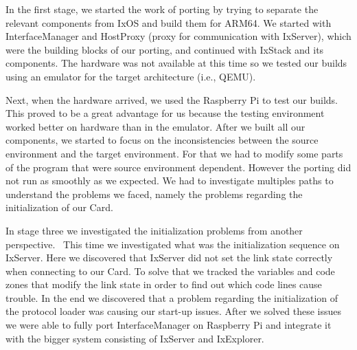 
In the first stage, we started the work of porting by trying to separate the
relevant components from IxOS and build them for ARM64. We started with
InterfaceManager and HostProxy (proxy for communication with IxServer), which
were the building blocks of our porting, and continued with IxStack and its
components. The hardware was not available at this time so we tested our builds
using an emulator for the target architecture (i.e., QEMU).

Next, when the hardware arrived, we used the Raspberry Pi to test our builds.
This proved to be a great advantage for us because the testing environment
worked better on hardware than in the emulator. After we built all our
components, we started to focus on the inconsistencies between the source
environment and the target environment. For that we had to modify some parts of
the program that were source environment dependent. However the porting did not
run as smoothly as we expected. We had to investigate multiples paths to
understand the problems we faced, namely the problems regarding the
initialization of our Card.~

In stage three we investigated the initialization problems from another
perspective.~ This time we investigated what was the initialization sequence on
IxServer. Here we discovered that IxServer did not set the link state correctly
when connecting to our Card. To solve that we tracked the variables and code
zones that modify the link state in order to find out which code lines cause
trouble. In the end we discovered that a problem regarding the initialization
of the protocol loader was causing our start-up issues. After we solved
these issues we were able to fully port InterfaceManager on Raspberry Pi and
integrate it with the bigger system consisting of IxServer and IxExplorer.

